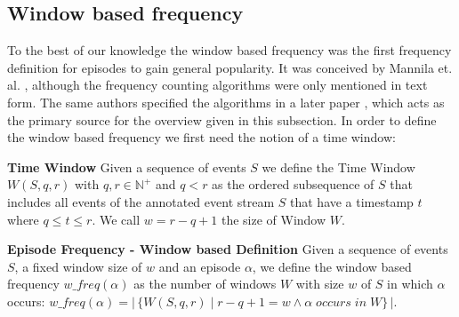 \subsection{Window based frequency}
\label{subsec_windowBased}
To the best of our knowledge the window based frequency was the first frequency definition for episodes to gain general popularity. It was conceived by Mannila et. al. \cite{mannila1995discovering}, although the frequency counting algorithms were only mentioned in text form. The same authors  specified the algorithms in a later paper \cite{mannila1997discovery}, which acts as the primary source for the overview given in this subsection. In order to define the window based frequency we first need the notion of a time window: 

\begin{mydef}
\textbf{Time Window} Given a sequence of events $S$ we define the Time Window $W(S,q,r)$ with $q,r \in \mathbb{N}^+$ and $q < r$ as the ordered subsequence of $S$ that includes all events of the annotated event stream $S$ that have a timestamp $t$ where $q \leq t\leq r$. We call $w = r-q+1$ the size of Window $W$.
\end{mydef}


\begin{mydef}
\textbf{Episode Frequency - Window based Definition} Given a sequence of events $S$, a fixed window size of $w$ and an episode $\alpha$, we define the window based frequency $w\_freq(\alpha )$ as the number of windows $W$ with size $w$ of $S$ in which $\alpha$ occurs: $w\_freq(\alpha ) = |\,\{W(S,q,r) \mid r-q+1 = w \land \alpha \;occurs\; in\; W \}\,|$. %
\end{mydef}

